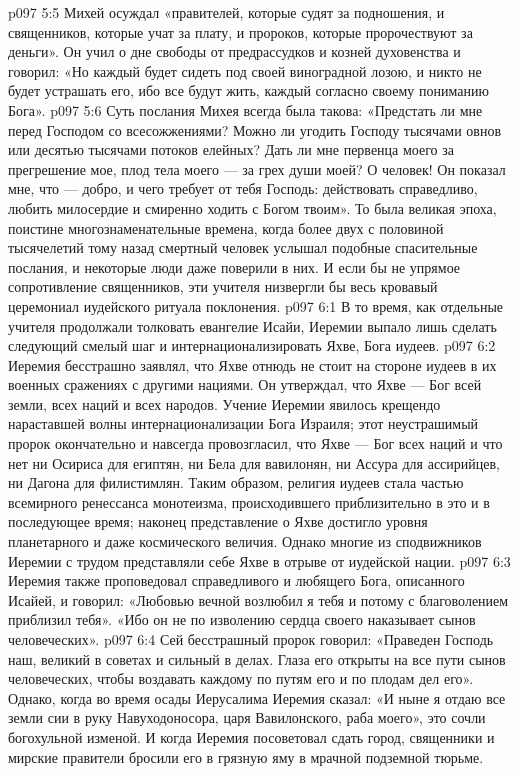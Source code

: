 \vs p097 5:5 Михей осуждал «правителей, которые судят за подношения, и священников, которые учат за плату, и пророков, которые пророчествуют за деньги». Он учил о дне свободы от предрассудков и козней духовенства и говорил: «Но каждый будет сидеть под своей виноградной лозою, и никто не будет устрашать его, ибо все будут жить, каждый согласно своему пониманию Бога».
\vs p097 5:6 Суть послания Михея всегда была такова: «Предстать ли мне перед Господом со всесожжениями? Можно ли угодить Господу тысячами овнов или десятью тысячами потоков елейных? Дать ли мне первенца моего за прегрешение мое, плод тела моего --- за грех души моей? О человек! Он показал мне, что --- добро, и чего требует от тебя Господь: действовать справедливо, любить милосердие и смиренно ходить с Богом твоим». То была великая эпоха, поистине многознаменательные времена, когда более двух с половиной тысячелетий тому назад смертный человек услышал подобные спасительные послания, и некоторые люди даже поверили в них. И если бы не упрямое сопротивление священников, эти учителя низвергли бы весь кровавый церемониал иудейского ритуала поклонения.
\vs p097 6:1 В то время, как отдельные учителя продолжали толковать евангелие Исайи, Иеремии выпало лишь сделать следующий смелый шаг и интернационализировать Яхве, Бога иудеев.
\vs p097 6:2 Иеремия бесстрашно заявлял, что Яхве отнюдь не стоит на стороне иудеев в их военных сражениях с другими нациями. Он утверждал, что Яхве --- Бог всей земли, всех наций и всех народов. Учение Иеремии явилось крещендо нараставшей волны интернационализации Бога Израиля; этот неустрашимый пророк окончательно и навсегда провозгласил, что Яхве --- Бог всех наций и что нет ни Осириса для египтян, ни Бела для вавилонян, ни Ассура для ассирийцев, ни Дагона для филистимлян. Таким образом, религия иудеев стала частью всемирного ренессанса монотеизма, происходившего приблизительно в это и в последующее время; наконец представление о Яхве достигло уровня планетарного и даже космического величия. Однако многие из сподвижников Иеремии с трудом представляли себе Яхве в отрыве от иудейской нации.
\vs p097 6:3 Иеремия также проповедовал справедливого и любящего Бога, описанного Исайей, и говорил: «Любовью вечной возлюбил я тебя и потому с благоволением приблизил тебя». «Ибо он не по изволению сердца своего наказывает сынов человеческих».
\vs p097 6:4 Сей бесстрашный пророк говорил: «Праведен Господь наш, великий в советах и сильный в делах. Глаза его открыты на все пути сынов человеческих, чтобы воздавать каждому по путям его и по плодам дел его». Однако, когда во время осады Иерусалима Иеремия сказал: «И ныне я отдаю все земли сии в руку Навуходоносора, царя Вавилонского, раба моего», это сочли богохульной изменой. И когда Иеремия посоветовал сдать город, священники и мирские правители бросили его в грязную яму в мрачной подземной тюрьме.
